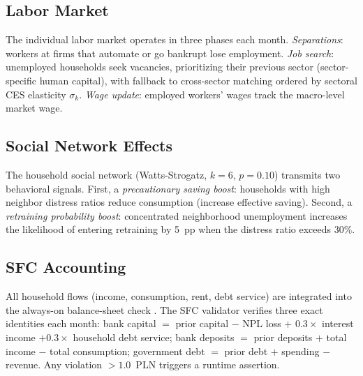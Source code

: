 \documentclass[12pt,a4paper]{article}
\begin{document}
\subsection{Labor Market}
\label{sec:labor}

The individual labor market operates in three phases each month.
\emph{Separations}: workers at firms that automate or go bankrupt lose
employment. \emph{Job search}: unemployed households seek vacancies,
prioritizing their previous sector (sector-specific human capital), with
fallback to cross-sector matching ordered by sectoral CES elasticity
$\sigma_k$. \emph{Wage update}: employed workers' wages track the
macro-level market wage.

\subsection{Social Network Effects}
\label{sec:social}

The household social network (Watts-Strogatz, $k = 6$, $p = 0.10$)
transmits two behavioral signals. First, a \emph{precautionary saving
boost}: households with high neighbor distress ratios reduce consumption
(increase effective saving). Second, a \emph{retraining probability
boost}: concentrated neighborhood unemployment increases the likelihood
of entering retraining by 5~pp when the distress ratio exceeds 30\%.

\subsection{SFC Accounting}
\label{sec:sfc}

All household flows (income, consumption, rent, debt service) are
integrated into the always-on balance-sheet check
\parencite{godley2007}. The SFC validator verifies three exact identities
each month: bank capital $=$ prior capital $-$ NPL loss $+$
$0.3 \times$ interest income $+ 0.3 \times$ household debt service;
bank deposits $=$ prior deposits $+$ total income $-$ total consumption;
government debt $=$ prior debt $+$ spending $-$ revenue. Any violation
$> 1.0$~PLN triggers a runtime assertion.
\end{document}
